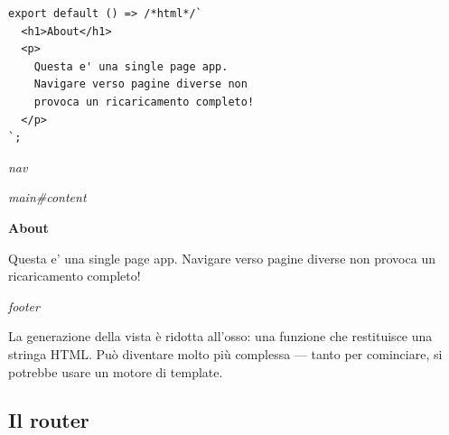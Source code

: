\begin{affianco}[0.42][c]
\begin{lstlisting}[style=js, name=views/about.js]
export default () => /*html*/`
  <h1>About</h1>
  <p>
    Questa e' una single page app.
    Navigare verso pagine diverse non
    provoca un ricaricamento completo!
  </p>
`;
\end{lstlisting}
\risultato
\begin{browser}
  {\wtuifont\color{neutral!45!black}\hfill\textit{nav}\par}\vspace{-9pt}
  \enspace{}\enspace{}
  \par\vspace{3pt}{\color{accent!40!white}\hrule}\vspace{4pt}
  {\wtuifont\color{accent!70!black}\hfill\textit{main\#content}\par}\vspace{-6pt}
  {\Lora\bfseries\LARGE About\par}\vspace{6pt}
  Questa e' una single page app. Navigare verso pagine diverse non provoca un
  ricaricamento completo!
  \par\vspace{4pt}{\color{accent!40!white}\hrule}\vspace{2pt}
  {\wtuifont\color{neutral!45!black}\hfill\textit{footer}\par}
\end{browser}
\end{affianco}

La generazione della vista è ridotta all'osso: una funzione che restituisce una
stringa HTML. Può diventare molto più complessa --- tanto per cominciare, si
potrebbe usare un motore di template.

\subsection{Il router}

